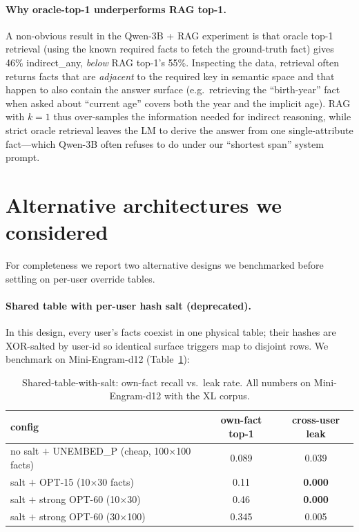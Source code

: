 \documentclass[letterpaper]{article} %
\begin{document}
\paragraph{Why oracle-top-1 underperforms RAG top-1.}
A non-obvious result in the Qwen-3B + RAG experiment is that
oracle top-1 retrieval (using the known required facts to
fetch the ground-truth fact) gives 46\% indirect\_any,
\emph{below} RAG top-1's 55\%. Inspecting the data, retrieval
often returns facts that are \emph{adjacent} to the required
key in semantic space and that happen to also contain the
answer surface (e.g.\ retrieving the ``birth-year'' fact when
asked about ``current age'' covers both the year and the
implicit age). RAG with $k=1$ thus over-samples the information
needed for indirect reasoning, while strict oracle retrieval
leaves the LM to derive the answer from one single-attribute
fact---which Qwen-3B often refuses to do under our ``shortest
span'' system prompt.

\section{Alternative architectures we considered}
\label{app:alt}

For completeness we report two alternative designs we benchmarked
before settling on per-user override tables.

\paragraph{Shared table with per-user hash salt (deprecated).}
In this design, every user's facts coexist in one physical table;
their hashes are XOR-salted by user-id so identical surface
triggers map to disjoint rows. We benchmark on Mini-Engram-d12
(Table~\ref{tab:salt-design}):

\begin{table}[t]
  \centering
  \caption{Shared-table-with-salt: own-fact recall vs.\ leak rate.
  All numbers on Mini-Engram-d12 with the XL corpus.}
  \label{tab:salt-design}
  \begin{tabular}{lcc}
    \toprule
    config & own-fact top-1 & cross-user leak \\
    \midrule
    no salt $+$ UNEMBED\_P (cheap, 100$\times$100 facts) & 0.089 & 0.039 \\
    salt $+$ OPT-15 (10$\times$30 facts) & 0.11 & \textbf{0.000} \\
    salt $+$ strong OPT-60 (10$\times$30) & 0.46 & \textbf{0.000} \\
    salt $+$ strong OPT-60 (30$\times$100) & 0.345 & 0.005 \\
    \bottomrule
  \end{tabular}
\end{table}
\end{document}
